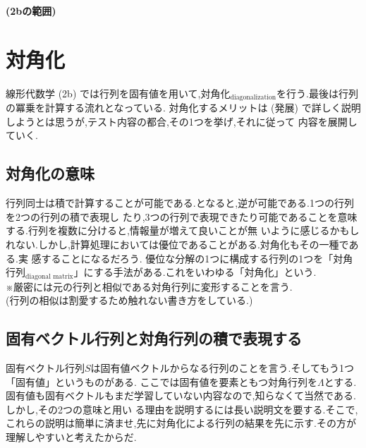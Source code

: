 \noindent
\textbf{(2bの範囲)}
\section{対角化}\label{sec:diagonalization}
線形代数学 (2b) では行列を固有値を用いて,対角化$_{\text{diagonalization}}$を行う.最後は行列の冪乗を計算する流れとなっている.
対角化するメリットは (発展) で詳しく説明しようとは思うが,テスト内容の都合,その1つを挙げ,それに従って
内容を展開していく.
\subsection{対角化の意味}
行列同士は積で計算することが可能である.となると,逆が可能である.1つの行列を2つの行列の積で表現し
たり,3つの行列で表現できたり可能であることを意味する.行列を複数に分けると,情報量が増えて良いことが無
いように感じるかもしれない.しかし,計算処理においては優位であることがある.対角化もその一種である.実
感することになるだろう.
優位な分解の1つに構成する行列の1つを「対角行列$_{\text{diagonal matrix}}$」にする手法がある.これをいわゆる「対角化」という.\\
※厳密には元の行列と相似である対角行列に変形することを言う.\\\hspace{7cm}(行列の相似は割愛するため触れない書き方をしている.)
\subsection{固有ベクトル行列と対角行列の積で表現する}
固有ベクトル行列$S$は固有値ベクトルからなる行列のことを言う.そしてもう1つ「固有値」というものがある.
ここでは固有値を要素ともつ対角行列を$\Lambda$とする.
固有値も固有ベクトルもまだ学習していない内容なので,知らなくて当然である.しかし,その2つの意味と用い
る理由を説明するには長い説明文を要する.そこで,これらの説明は簡単に済ませ,先に対角化による行列の結果を先に示す.その方が理解しやすいと考えたからだ.\\

